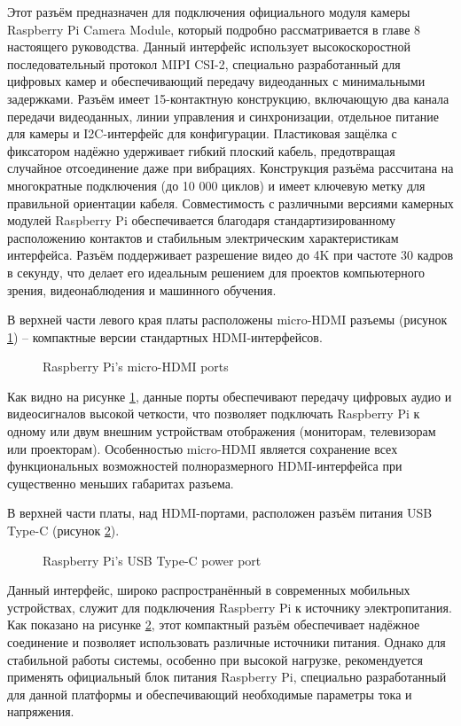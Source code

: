 Этот разъём предназначен для подключения официального модуля камеры Raspberry Pi Camera Module, который подробно рассматривается в главе 8 настоящего руководства. Данный интерфейс использует высокоскоростной последовательный протокол MIPI CSI-2, специально разработанный для цифровых камер и обеспечивающий передачу видеоданных с минимальными задержками. Разъём имеет 15-контактную конструкцию, включающую два канала передачи видеоданных, линии управления и синхронизации, отдельное питание для камеры и I2C-интерфейс для конфигурации. Пластиковая защёлка с фиксатором надёжно удерживает гибкий плоский кабель, предотвращая случайное отсоединение даже при вибрациях. Конструкция разъёма рассчитана на многократные подключения (до 10 000 циклов) и имеет ключевую метку для правильной ориентации кабеля. Совместимость с различными версиями камерных модулей Raspberry Pi обеспечивается благодаря стандартизированному расположению контактов и стабильным электрическим характеристикам интерфейса. Разъём поддерживает разрешение видео до 4K при частоте 30 кадров в секунду, что делает его идеальным решением для проектов компьютерного зрения, видеонаблюдения и машинного обучения.


В верхней части левого края платы расположены micro-HDMI разъемы (рисунок \ref{fig:microHDMI}) -- компактные версии стандартных HDMI-интерфейсов.

\begin{figure}[H]
	\centering
	\caption{Raspberry Pi’s micro-HDMI ports}
	\label{fig:microHDMI}
\end{figure}

Как видно на рисунке \ref{fig:microHDMI}, данные порты обеспечивают передачу цифровых аудио и видеосигналов высокой четкости, что позволяет подключать Raspberry Pi к одному или двум внешним устройствам отображения (мониторам, телевизорам или проекторам). Особенностью micro-HDMI является сохранение всех функциональных возможностей полноразмерного HDMI-интерфейса при существенно меньших габаритах разъема.


В верхней части платы, над HDMI-портами, расположен разъём питания USB Type-C (рисунок \ref{fig:typeC}).

\begin{figure}[H]
	\centering
	\caption{Raspberry Pi’s USB Type-C power port}
	\label{fig:typeC}
\end{figure}

Данный интерфейс, широко распространённый в современных мобильных устройствах, служит для подключения Raspberry Pi к источнику электропитания. Как показано на рисунке \ref{fig:typeC}, этот компактный разъём обеспечивает надёжное соединение и позволяет использовать различные источники питания. Однако для стабильной работы системы, особенно при высокой нагрузке, рекомендуется применять официальный блок питания Raspberry Pi, специально разработанный для данной платформы и обеспечивающий необходимые параметры тока и напряжения.


